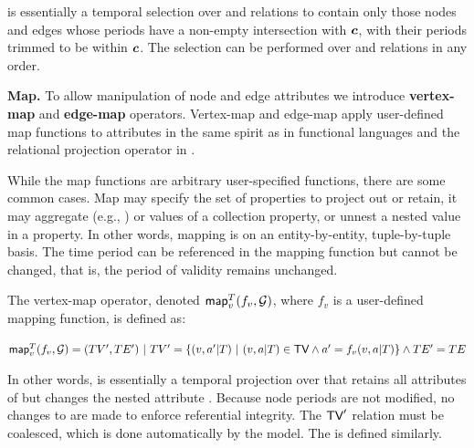  is essentially a temporal selection over \tv and \te
relations to contain only those nodes and edges whose periods have a
non-empty intersection with $\boldsymbol{c}$, with their periods trimmed to be
within $\boldsymbol{c}$.  The selection can be performed over \tv and \te
relations in any order.

{\bf Map.}  To allow manipulation of node and edge attributes we
introduce {\bf vertex-map} and {\bf edge-map} operators.  Vertex-map
and edge-map apply user-defined map functions to attributes in the
same spirit as  in functional languages and the relational
projection operator in \tra.

While the map functions are arbitrary user-specified functions, there
are some common cases.  Map may specify the set of properties to
project out or retain, it may aggregate (e.g., ) or
values of a collection property, or unnest a nested value in a
property.  In other words, mapping is on an entity-by-entity,
tuple-by-tuple basis.  The time period can be referenced in the
mapping function but cannot be changed, that is, the period of
validity remains unchanged.

\begin{definition}
\label{def:vmap}
The vertex-map operator, denoted $\textsf{map}^T_v(f_v,\mathcal{G})$, where $f_v$ is a
user-defined mapping function, is defined as:

$\textsf{map}^T_v(f_v,\mathcal{G}) = (TV', TE') ~|~ TV' = \{(v,a'|T)~|~ (v,a|T) \in \textsf{TV} \land a'= f_v(v,a|T)\} \land TE' = TE$
\end{definition}

In other words,  is essentially a temporal
projection over \tv that retains all attributes of \tv but changes the
nested attribute .  Because node periods are not modified, no
changes to \te are made to enforce referential integrity.  The $\textsf{TV}'$
relation must be coalesced, which is done automatically by the model.
The  is defined similarly.

